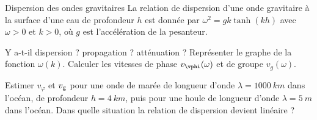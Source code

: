 \begin{exo}[PC][1][TD]{Dispersion des ondes gravitaires}
  La relation de dispersion d'une onde gravitaire à la surface d'une eau de profondeur $h$ est donnée par
$
 \omega^2=gk\tanh(kh)
$ avec $\omega>0$ et $k>0$,
 où $g$ est l'accélération de la pesanteur.
\begin{quest}
\item Y a-t-il dispersion ? propagation ? atténuation ? Représenter le graphe de la fonction $\omega(k)$. Calculer les vitesses de phase $v_{\vphi}(\omega)$ et de groupe $v_g(\omega)$.
\item Estimer $v_\varphi$ et $v_{\rm{g}}$ pour une onde de marée de longueur d'onde $\lambda= \SI{1000}{km}$ dans l'océan, de profondeur $h=\SI{4}{km}$, puis pour une houle de longueur d'onde $\lambda = \SI{5}{m}$ dans l'océan. Dans quelle situation la relation de dispersion devient linéaire ?

\end{quest}
\end{exo}
